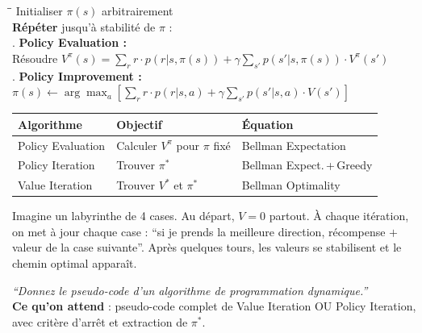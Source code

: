 \documentclass[11pt,a4paper]{article}
\begin{document}
\begin{formbox}
{\ttfamily
\begin{tabbing}
\hspace{6mm}\=\hspace{6mm}\=\kill
Initialiser $\pi(s)$ arbitrairement\\[2pt]
\textbf{Répéter} jusqu'à stabilité de $\pi$ :\\
. \textbf{Policy Evaluation :}\\
\>\> Résoudre $V^\pi(s) = \sum_r r\cdot p(r|s,\pi(s)) + \gamma \sum_{s'} p(s'|s,\pi(s)) \cdot V^\pi(s')$\\[2pt]
. \textbf{Policy Improvement :}\\
\>\> $\pi(s) \leftarrow \arg\max_a \left[\sum_r r\cdot p(r|s,a) + \gamma \sum_{s'} p(s'|s,a) \cdot V(s')\right]$
\end{tabbing}}
\end{formbox}

\begin{center}
\renewcommand{\arraystretch}{1.3}
\begin{tabular}{lll}
\toprule
\textbf{Algorithme} & \textbf{Objectif} & \textbf{Équation} \\
\midrule
Policy Evaluation & Calculer $V^\pi$ pour $\pi$ fixé & Bellman Expectation \\
Policy Iteration & Trouver $\pi^*$ & Bellman Expect.\,+\,Greedy \\
Value Iteration & Trouver $V^*$ et $\pi^*$ & Bellman Optimality \\
\bottomrule
\end{tabular}
\end{center}

\begin{exbox}
Imagine un labyrinthe de 4 cases. Au départ, $V = 0$ partout. À chaque itération, on met à jour chaque case : ``si je prends la meilleure direction, récompense $+$ valeur de la case suivante''. Après quelques tours, les valeurs se stabilisent et le chemin optimal apparaît.
\end{exbox}

\begin{exambox}
\textit{``Donnez le pseudo-code d'un algorithme de programmation dynamique.''}\\[4pt]
\textbf{Ce qu'on attend} : pseudo-code complet de Value Iteration OU Policy Iteration, avec critère d'arrêt et extraction de $\pi^*$.
\end{exambox}
\end{document}

